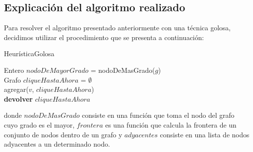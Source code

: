 \subsection{Explicación del algoritmo realizado}
Para resolver el algoritmo presentado anteriormente con una técnica golosa, decidimos utilizar el procedimiento que se presenta a continuación:\newline
\newline
\begin{algorithm}[H]
    \SetAlgoLined
    \caption{HeurísticaGolosa}
	Entero $nodoDeMayorGrado$ = nodoDeMasGrado($g$)\\
	Grafo $cliqueHastaAhora$ = $\emptyset$\\
	agregar($v$, $cliqueHastaAhora$)\\
\textbf{devolver} $cliqueHastaAhora$
\end{algorithm}

donde $nodoDeMasGrado$ consiste en una función que toma el nodo del grafo cuyo grado es el mayor, $frontera$ es una función que calcula la frontera de un conjunto de nodos dentro de un grafo y $adyacentes$ consiste en una lista de nodos adyacentes a un determinado nodo.\newline



